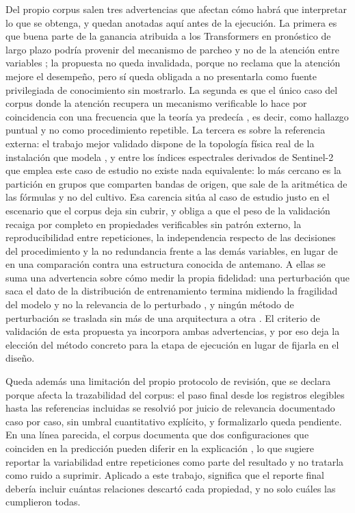 Del propio corpus salen tres advertencias que afectan cómo habrá que interpretar lo que se obtenga, y quedan anotadas aquí antes de la ejecución. La primera es que buena parte de la ganancia atribuida a los Transformers en pronóstico de largo plazo podría provenir del mecanismo de parcheo y no de la atención entre variables \cite{patchmlp2025unlocking}; la propuesta no queda invalidada, porque no reclama que la atención mejore el desempeño, pero sí queda obligada a no presentarla como fuente privilegiada de conocimiento sin mostrarlo. La segunda es que el único caso del corpus donde la atención recupera un mecanismo verificable lo hace por coincidencia con una frecuencia que la teoría ya predecía \cite{rotorcraft2026vortexring}, es decir, como hallazgo puntual y no como procedimiento repetible. La tercera es sobre la referencia externa: el trabajo mejor validado dispone de la topología física real de la instalación que modela \cite{pipeline2026causalgraph}, y entre los índices espectrales derivados de Sentinel-2 que emplea este caso de estudio \cite{segarra2020sentinel} no existe nada equivalente: lo más cercano es la partición en grupos que comparten bandas de origen, que sale de la aritmética de las fórmulas y no del cultivo. Esa carencia sitúa al caso de estudio justo en el escenario que el corpus deja sin cubrir, y obliga a que el peso de la validación recaiga por completo en propiedades verificables sin patrón externo, la reproducibilidad entre repeticiones, la independencia respecto de las decisiones del procedimiento y la no redundancia frente a las demás variables, en lugar de en una comparación contra una estructura conocida de antemano. A ellas se suma una advertencia sobre cómo medir la propia fidelidad: una perturbación que saca el dato de la distribución de entrenamiento termina midiendo la fragilidad del modelo y no la relevancia de lo perturbado \cite{meng2023perturbation}, y ningún método de perturbación se traslada sin más de una arquitectura a otra \cite{simic2025perturbation}. El criterio de validación de esta propuesta ya incorpora ambas advertencias, y por eso deja la elección del método concreto para la etapa de ejecución en lugar de fijarla en el diseño.

Queda además una limitación del propio protocolo de revisión, que se declara porque afecta la trazabilidad del corpus: el paso final desde los registros elegibles hasta las referencias incluidas se resolvió por juicio de relevancia documentado caso por caso, sin umbral cuantitativo explícito, y formalizarlo queda pendiente. En una línea parecida, el corpus documenta que dos configuraciones que coinciden en la predicción pueden diferir en la explicación \cite{bogaert2026variability}, lo que sugiere reportar la variabilidad entre repeticiones como parte del resultado y no tratarla como ruido a suprimir. Aplicado a este trabajo, significa que el reporte final debería incluir cuántas relaciones descartó cada propiedad, y no solo cuáles las cumplieron todas.
